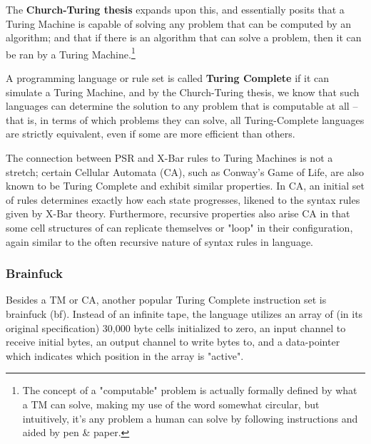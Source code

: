 \documentclass[runningheads]{llncs}
\begin{document}
The \textbf{Church-Turing thesis}\cite{kleene1952}
expands upon this, and essentially posits that a Turing Machine is capable of solving any problem that can be computed by an algorithm; and that if there is an algorithm that can solve a problem, then it can be ran by a Turing Machine.\footnote{The concept of a "computable" problem is actually formally defined by what a TM can solve, making my use of the word somewhat circular, but intuitively, it's any problem a human can solve by following instructions and aided by pen \& paper.}

A programming language or rule set is called \textbf{Turing Complete} if it can simulate a Turing Machine, and by the Church-Turing thesis, we know that such languages can determine the solution to any problem that is computable at all -- that is, in terms of which problems they can solve, all Turing-Complete languages are strictly equivalent, even if some are more efficient than others.

The connection between PSR and X-Bar rules to Turing Machines is not a stretch; certain Cellular Automata (CA), such as Conway's Game of Life, are also known to be Turing Complete and exhibit similar properties.\cite{berlekamp2001}
In CA, an initial set of rules determines exactly how each state progresses, likened to the syntax rules given by X-Bar theory. Furthermore, recursive properties also arise CA in that some cell structures of can replicate themselves or "loop" in their configuration, again similar to the often recursive nature of syntax rules in language.

\subsubsection{Brainfuck}
Besides a TM or CA, another popular Turing Complete instruction set is brainfuck (bf). Instead of an infinite tape, the language utilizes an array of (in its original specification) 30,000 byte cells initialized to zero, an input channel to receive initial bytes, an output channel to write bytes to, and a data-pointer which indicates which position in the array is "active".
\end{document}
